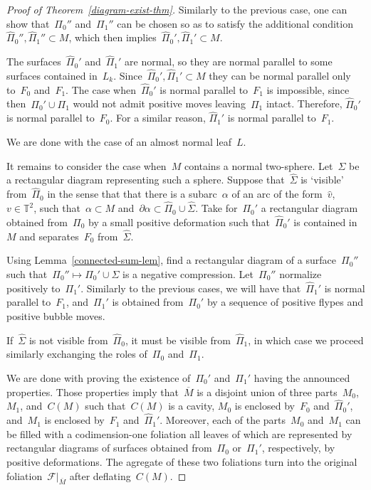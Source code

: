 \documentclass{amsart}
\theoremstyle{theorem}
\theoremstyle{remark}
\theoremstyle{definition}
\numberwithin{equation}{section}
\numberwithin{figure}{section}
\begin{document}
\begin{proof}[Proof of Theorem~\ref{diagram-exist-thm}]
Similarly to the previous case, one can show that~$\Pi_0''$ and~$\Pi_1''$
can be chosen so as to satisfy the additional condition~$\widehat\Pi_0'',\widehat\Pi_1''\subset M$,
which then implies~$\widehat\Pi_0',\widehat\Pi_1'\subset M$.

The surfaces~$\widehat\Pi_0'$ and~$\widehat\Pi_1'$ are normal, so they are
normal parallel to some surfaces contained in~$L_k$. Since~$\widehat\Pi_0',\widehat\Pi_1'\subset M$
they can be normal parallel only to~$F_0$ and~$F_1$. The case
when~$\widehat\Pi_0'$ is normal parallel to~$F_1$ is impossible, since
then~$\Pi_0'\cup\Pi_1$ would not admit positive moves leaving~$\Pi_1$ intact. Therefore,
$\widehat\Pi_0'$ is normal parallel to~$F_0$. For a similar reason, $\widehat\Pi_1'$ is
normal parallel to~$F_1$.

We are done with the case of an almost normal leaf~$L$.

It remains to consider the case when~$M$ contains a normal two-sphere. Let~$\Sigma$
be a rectangular diagram representing such a sphere. Suppose that~$\widehat\Sigma$
is `visible' from~$\widehat\Pi_0$ in the sense that that there is a subarc~$\alpha$
of an arc of the form~$\widehat v$, $v\in\mathbb T^2$, such that~$\alpha\subset M$
and~$\partial\alpha\subset\widehat\Pi_0\cup\widehat\Sigma$. Take for~$\Pi_0'$
a rectangular diagram obtained from~$\Pi_0$ by a small positive deformation
such that~$\widehat\Pi_0'$ is contained in~$M$ and separates~$F_0$ from~$\widehat\Sigma$.

Using Lemma~\ref{connected-sum-lem}, find a rectangular diagram of a surface~$\Pi_0''$
such that~$\Pi_0''\mapsto\Pi_0'\cup\Sigma$ is a negative compression. Let~$\Pi_0''$
normalize positively to~$\Pi_1'$. Similarly to the previous cases, we will have
that~$\widehat\Pi_1'$ is normal parallel to~$F_1$, and~$\Pi_1'$ is obtained from~$\Pi_0'$
by a sequence of positive flypes and positive bubble moves.

If~$\widehat\Sigma$ is not visible from~$\widehat\Pi_0$, it must be visible from~$\widehat\Pi_1$,
in which case we proceed similarly exchanging the roles of~$\Pi_0$ and~$\Pi_1$.

We are done with proving the existence of~$\Pi_0'$ and~$\Pi_1'$ having the announced properties.
Those properties imply that~$\overline M$ is a disjoint union of three parts~$M_0$, $M_1$, and~$C(M)$ such
that~$C(M)$ is a cavity, $M_0$ is enclosed by~$F_0$ and~$\widehat\Pi_0'$,
and~$M_1$ is enclosed by~$F_1$ and~$\widehat\Pi_1'$.
Moreover, each of the parts~$M_0$ and~$M_1$ can be filled with a codimension-one
foliation all leaves of which are represented by rectangular diagrams of surfaces obtained
from~$\Pi_0$ or~$\Pi_1'$, respectively, by positive deformations. The agregate of these two foliations
turn into the original foliation~$\mathscr F|_{\overline M}$ after deflating~$C(M)$.


\end{proof}
\end{document}
